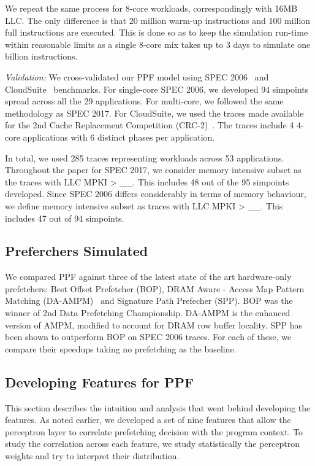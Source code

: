 We repeat the same process for 8-core workloads, correspondingly with 16MB
LLC.  The only difference is that 20 million warm-up instructions and 100
million full instructions are executed.  This is done so as to keep the
simulation run-time within reasonable limits as a single 8-core mix takes up
to 3 days to simulate one billion instructions.

\textit{Validation:} We cross-validated our PPF model using SPEC
2006~\cite{SPEC2006} and CloudSuite~\cite{CloudSuite} benchmarks.  For
single-core SPEC 2006, we developed 94 simpoints spread across all the 29
applications. For multi-core, we followed the same methodology as SPEC 2017.
For CloudSuite, we used the traces made available for the 2nd Cache
Replacement Competition (CRC-2)~\cite{CRC_2}.  The traces include 4 4-core
applications with 6 distinct phases per application.

In total, we used 285 traces representing workloads across 53 applications.
Throughout the paper for SPEC 2017, we consider memory intensive subset as the
traces with LLC MPKI > \_\_.  This includes 48 out of the 95 simpoints
developed.  Since SPEC 2006 differs considerably in terms of memory behaviour,
we define memory intensive subset as traces with LLC MPKI > \_\_.  This
includes 47 out of 94 simpoints.

\subsection{Preferchers Simulated}
\label{Method-Prefetchers}
We compared PPF against three of the latest state of the art hardware-only
prefetchers: Best Offset Prefetcher (BOP), DRAM Aware - Access Map Pattern
Matching (DA-AMPM)~\cite{DA_AMPM} and Signature Path Prefecher (SPP).  BOP was
the winner of 2nd Data Prefetching Championship.  DA-AMPM is the enhanced
version of AMPM, modified to account for DRAM row buffer locality.  SPP has
been shown to outperform BOP on SPEC 2006 traces.  For each of these, we
compare their speedups taking no prefetching as the baseline.

\subsection{Developing Features for PPF}
\label{Method-Features}
This section describes the intuition and analysis that went behind developing
the features.  As noted earlier, we developed a set of nine features that allow
the perceptron layer to correlate prefetching decision with the program
context.  To study the correlation across each feature, we study statistically
the perceptron weights and try to interpret their distribution.


